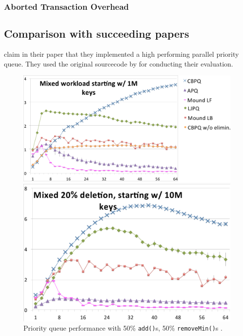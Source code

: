 \subsubsection{Aborted Transaction Overhead}

\subsection{Comparison with succeeding papers}

\citeauthor{braginsky_cbpq:_2016} claim in their paper that they implemented a high performing parallel priority queue. They used the original sourcecode by \citeauthor{calciu_adaptive_2014} for conducting their evaluation.

\begin{figure}[htb]
	\centering
	\begin{minipage}[b]{.7\textwidth}
		\centering
		\includegraphics[width=\linewidth]{graphics/cbpq_50add_50.png}
		\caption{Priority queue performance with 50\% \texttt{add()}s, 50\% \texttt{removeMin()}s \cite{braginsky_cbpq:_2016}.}
		\label{fig:cbpq_50}
	\end{minipage}
	\hfill%
	\begin{minipage}[b]{.495\textwidth}
		\centering
		\includegraphics[width=\linewidth]{graphics/cbpq_80add_20.png}

\end{minipage}
\end{figure}
